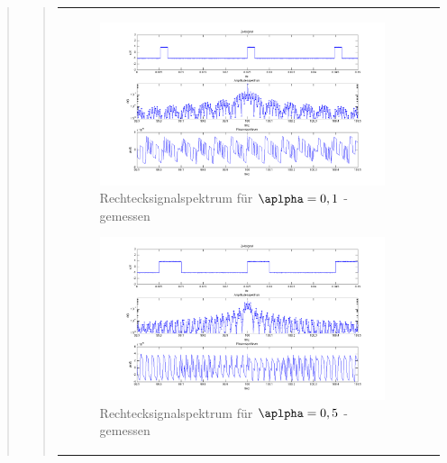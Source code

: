 \begin{quote}
\begin{quote}
\begin{center}
\begin{tabular}{ll}
\begin{minipage}{0.6\textwidth}
                
                \end{minipage}

                \begin{minipage}{0.6\textwidth}

                    \begin{figure}[H]
                        \label{fig:}            
                        \includegraphics[scale=0.3]{./Bilder/recht_alpha1_-_gemessen.png} %
                        \caption{Rechtecksignalspektrum für $\aplpha = 0,1$ - gemessen}
                    \end{figure}                
                    
                    \begin{figure}[H]
                        \label{fig:}            
                        \includegraphics[scale=0.3]{./Bilder/recht_alpha5_-_gemessen.png} %
                        \caption{Rechtecksignalspektrum für $\aplpha = 0,5$ - gemessen}
                    \end{figure}                


\end{minipage}
\end{tabular}
\end{center}
\end{quote}
\end{quote}
